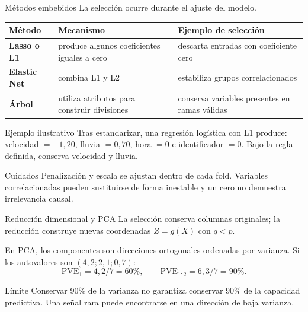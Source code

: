 \documentclass[aspectratio=169,10pt]{beamer}
\begin{document}
\begin{frame}{Métodos embebidos}
  \footnotesize
  La selección ocurre durante el ajuste del modelo.
  \begin{tabularx}{\textwidth}{>{\bfseries}p{}p{}X}
    \toprule Método & Mecanismo & Ejemplo de selección \\ \midrule
    Lasso o L1 & produce algunos coeficientes iguales a cero & descarta entradas con coeficiente cero \\
    Elastic Net & combina L1 y L2 & estabiliza grupos correlacionados \\
    Árbol & utiliza atributos para construir divisiones & conserva variables presentes en ramas válidas \\
    \bottomrule
  \end{tabularx}
  \begin{block}{Ejemplo ilustrativo}
    Tras estandarizar, una regresión logística con L1 produce: velocidad $=-1{,}20$, lluvia $=0{,}70$, hora $=0$ e identificador $=0$. Bajo la regla definida, conserva velocidad y lluvia.
  \end{block}
  \begin{alertblock}{Cuidados}
    Penalización y escala se ajustan dentro de cada fold. Variables correlacionadas pueden sustituirse de forma inestable y un cero no demuestra irrelevancia causal.
  \end{alertblock}
\end{frame}

\begin{frame}{Reducción dimensional y PCA}
  \small
  La selección conserva columnas originales; la reducción construye nuevas coordenadas $Z=g(X)$ con $q<p$.
  \vspace{.35em}

  En PCA, los componentes son direcciones ortogonales ordenadas por varianza. Si los autovalores son $(4{,}2;2{,}1;0{,}7)$:
  \[
    \mathrm{PVE}_1=4{,}2/7=60\%,\qquad
    \mathrm{PVE}_{1:2}=6{,}3/7=90\%.
  \]
  \begin{alertblock}{Límite}
    Conservar 90\% de la varianza no garantiza conservar 90\% de la capacidad predictiva. Una señal rara puede encontrarse en una dirección de baja varianza.
  \end{alertblock}
\end{frame}
\end{document}

